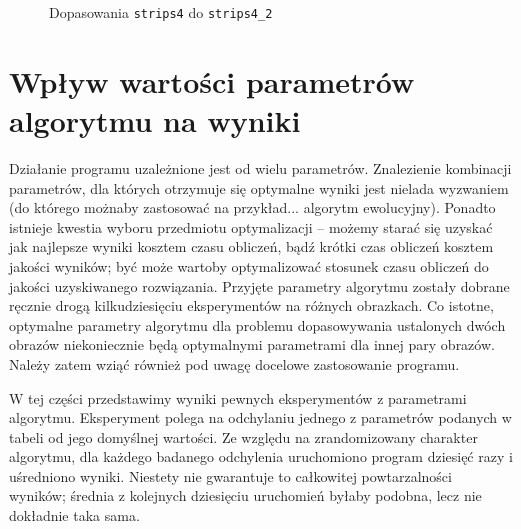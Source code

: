 \documentclass[a4paper,12pt,leqno]{article}
\begin{document}
\begin{figure}\centering
{}\hspace{5mm}
\caption{Dopasowania \texttt{strips4} do \texttt{strips4\_2}}
\end{figure}

\section{Wpływ wartości parametrów algorytmu na wyniki}

Działanie programu uzależnione jest od wielu parametrów. Znalezienie kombinacji parametrów, dla których otrzymuje się optymalne wyniki jest nielada
wyzwaniem (do którego możnaby zastosować na przykład... algorytm ewolucyjny). Ponadto istnieje kwestia wyboru przedmiotu optymalizacji -- możemy starać
się uzyskać jak najlepsze wyniki kosztem czasu obliczeń, bądź krótki czas obliczeń kosztem jakości wyników; być może wartoby optymalizować stosunek
czasu obliczeń do jakości uzyskiwanego rozwiązania. Przyjęte parametry algorytmu zostały dobrane ręcznie drogą kilkudziesięciu eksperymentów na
różnych obrazkach. Co istotne, optymalne parametry algorytmu dla problemu dopasowywania ustalonych dwóch obrazów niekoniecznie będą optymalnymi
parametrami dla innej pary obrazów. Należy zatem wziąć również pod uwagę docelowe zastosowanie programu. 

W tej części przedstawimy wyniki pewnych eksperymentów z parametrami algorytmu. Eksperyment polega na odchylaniu jednego z parametrów podanych w 
tabeli od jego domyślnej wartości. Ze względu na zrandomizowany charakter algorytmu, dla każdego badanego odchylenia uruchomiono program dziesięć
razy i uśredniono wyniki. Niestety nie gwarantuje to całkowitej powtarzalności wyników; średnia z kolejnych dziesięciu uruchomień byłaby podobna,
lecz nie dokładnie taka sama.
\end{document}

